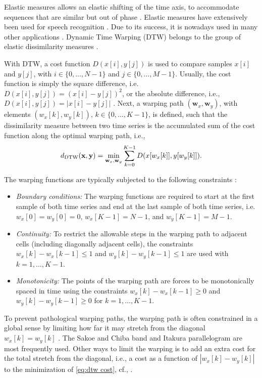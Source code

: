 \documentclass[10pt,final,a4paper,oneside,onecolumn]{article}
\newcommand{\ddtw}{d_{\textup{DTW}}}
\theoremstyle{plain}\newtheorem{definition}{Definition}[section]    %
\theoremstyle{definition}\newtheorem{example}{Example}[section]     %
\theoremstyle{remark}\newtheorem{remarkenv}{Remark}[section]        %
\begin{document}
Elastic measures allows an elastic shifting of the time axis, to accommodate sequences that are similar but out of phase \cite{keogh2005exactDTW}. Elastic measures have extensively been used for speech recognition \cite{rabiner1993speech, muller2007information}. Due to its success, it is nowadays used in many other applications \cite{serra2014empirical, wang2013distancemeasures}. Dynamic Time Warping (DTW) \cite{sakoe1978dynamic, berndt1994using} belongs to the group of elastic dissimilarity measures \cite{wang2013distancemeasures}.

With DTW, a cost function $D(x[i], y[j])$ is used to compare samples $x[i]$ and $y[j]$, with $i \in \{0, \ldots, N-1\}$ and $j \in \{0, \ldots, M-1\}$. Usually, the cost function is simply the square difference, i.e. $D(x[i], y[j]) = (x[i]-y[j])^2$, or the absolute difference, i.e., $D(x[i], y[j])=|x[i] - y[j]|$ \cite{berndt1994using}. Next, a warping path $(\textbf{w}_x, \textbf{w}_y)$, with elements $(w_x[k], w_y[k]),\,k \in \{0, \ldots, K-1\}$, is defined, such that the dissimilarity measure between two time series is the accumulated sum of the cost function along the optimal warping path, i.e.,
\begin{equation} \label{eq:dtw cost}
	\ddtw(\textbf{x}, \textbf{y}) = \min_{\textbf{w}_x, \textbf{w}_y} \sum_{k=0}^{K-1} D(x[w_x[k]], y[w_y[k]]).
\end{equation}

The warping functions are typically subjected to the following constraints \cite{keogh2005exactDTW}:
\begin{itemize}
	\item \emph{Boundary conditions:} The warping functions are required to start at the first sample of both time series and end at the last sample of both time series, i.e. $w_x[0]=w_y[0]=0$, $w_x[K-1]=N-1$, and $w_y[K-1]=M-1$. 
	\item \emph{Continuity:} To restrict the allowable steps in the warping path to adjacent cells (including diagonally adjacent cells), the constraints $w_x[k] - w_x[k-1] \leq 1$ and $w_y[k] - w_y[k-1] \leq 1$ are used with $k=1, \ldots, K-1$.
	\item \emph{Monotonicity:} The points of the warping path are forces to be monotonically spaced in time using the constraints $w_x[k] - w_x[k-1] \geq 0$ and $w_y[k] - w_y[k-1] \geq 0$ for $k=1, \ldots, K-1$. 
\end{itemize}

To prevent pathological warping paths, the warping path is often constrained in a global sense by limiting how far it may stretch from the diagonal $w_x[k]=w_y[k]$ \cite{keogh2005exactDTW}. The Sakoe and Chiba band \cite{sakoe1978dynamic} and Itakura parallelogram \cite{itakura1975minimum} are most frequently used. Other ways to limit the warping is to add an extra cost for the total stretch from the diagonal, i.e., a cost as a function of $|w_x[k] - w_y[k]|$ to the minimization of \cref{eq:dtw cost}, cf., \cite{roberts1987enhancements, wang1997alignment}.
\end{document}
